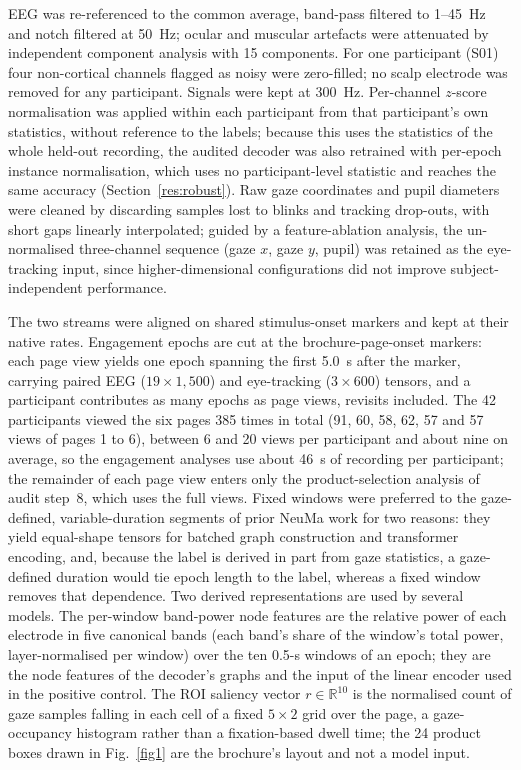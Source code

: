 EEG was re-referenced to the common average, band-pass filtered to 1--45~Hz and notch filtered at 50~Hz; ocular and muscular artefacts were attenuated by independent component analysis with 15 components. For one participant (S01) four non-cortical channels flagged as noisy were zero-filled; no scalp electrode was removed for any participant. Signals were kept at 300~Hz. Per-channel $z$-score normalisation was applied within each participant from that participant's own statistics, without reference to the labels; because this uses the statistics of the whole held-out recording, the audited decoder was also retrained with per-epoch instance normalisation, which uses no participant-level statistic and reaches the same accuracy (Section~\ref{res:robust}). Raw gaze coordinates and pupil diameters were cleaned by discarding samples lost to blinks and tracking drop-outs, with short gaps linearly interpolated; guided by a feature-ablation analysis, the un-normalised three-channel sequence (gaze $x$, gaze $y$, pupil) was retained as the eye-tracking input, since higher-dimensional configurations did not improve subject-independent performance.

The two streams were aligned on shared stimulus-onset markers and kept at their native rates. Engagement epochs are cut at the brochure-page-onset markers: each page view yields one epoch spanning the first 5.0~s after the marker, carrying paired EEG ($19\times1{,}500$) and eye-tracking ($3\times600$) tensors, and a participant contributes as many epochs as page views, revisits included. The 42 participants viewed the six pages 385 times in total (91, 60, 58, 62, 57 and 57 views of pages 1 to 6), between 6 and 20 views per participant and about nine on average, so the engagement analyses use about 46~s of recording per participant; the remainder of each page view enters only the product-selection analysis of audit step~8, which uses the full views. Fixed windows were preferred to the gaze-defined, variable-duration segments of prior NeuMa work \cite{ref18} for two reasons: they yield equal-shape tensors for batched graph construction and transformer encoding, and, because the label is derived in part from gaze statistics, a gaze-defined duration would tie epoch length to the label, whereas a fixed window removes that dependence. Two derived representations are used by several models. The per-window band-power node features are the relative power of each electrode in five canonical bands (each band's share of the window's total power, layer-normalised per window) over the ten 0.5-s windows of an epoch; they are the node features of the decoder's graphs and the input of the linear encoder used in the positive control. The ROI saliency vector $r\in\mathbb{R}^{10}$ is the normalised count of gaze samples falling in each cell of a fixed $5\times2$ grid over the page, a gaze-occupancy histogram rather than a fixation-based dwell time; the 24 product boxes drawn in Fig.~\ref{fig1} are the brochure's layout and not a model input.

